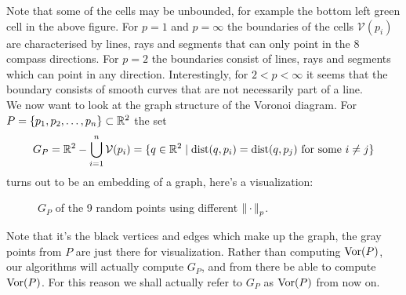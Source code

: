 Note that some of the cells may be unbounded, for example the bottom left green cell in the above figure. For $p = 1$ and $p = \infty$ the boundaries of the cells $\mathcal{V}(p_i)$ are characterised by lines, rays and segments that can only point in the 8 compass directions. For $p = 2$ the boundaries consist of lines, rays and segments which can point in any direction. Interestingly, for $2 < p < \infty$ it seems that the boundary consists of smooth curves that are not necessarily part of a line. \\

We now want to look at the graph structure of the Voronoi diagram. For $P = \{p_1, p_2, \ldots, p_n\} \subset \mathbb{R}^2$ the set
\[
    G_P = \mathbb{R}^2 - \bigcup_{i=1}^n \mathcal{V}(p_i)
    = \{q \in \mathbb{R}^2 \mid \operatorname{dist}(q, p_i) = \operatorname{dist}(q, p_j) \text{ for some } i \ne j\}
\]
turns out to be an embedding of a graph, here's a visualization:
\begin{figure}[H]
    \centering
    \hspace{0mm}
    \caption{$G_P$ of the 9 random points using different $\left\lVert \,\cdot\, \right\rVert_p$.}
\end{figure}
Note that it's the black vertices and edges which make up the graph, the gray points from $P$ are just there for visualization. Rather than computing $\operatorname{Vor}(P)$, our algorithms will actually compute $G_P$, and from there be able to compute $\operatorname{Vor}(P)$. For this reason we shall actually refer to $G_P$ as $\operatorname{Vor}(P)$ from now on.